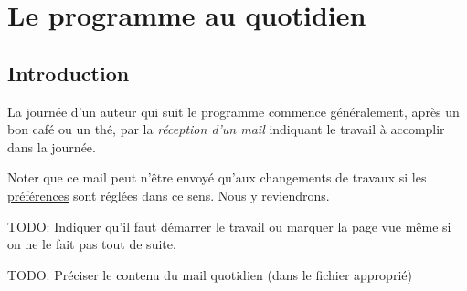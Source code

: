 % 
% 
% 
% 
% 
% 
% 
% 

\chapter{Le programme au quotidien}\hypertarget{programme-quotidien}{}\label{programme-quotidien}

\section{Introduction}\hypertarget{introduction}{}\label{introduction}

La journée d'un auteur qui suit le programme \unan{} commence généralement, après un bon café ou un thé, par la \emph{réception d'un mail} indiquant le travail à accomplir dans  la journée.

Noter que ce mail peut n'être envoyé qu'aux changements de travaux si les \hyperlink{preferences-auteur}{préférences} sont réglées dans ce sens. Nous y reviendrons.

TODO: Indiquer qu'il faut démarrer le travail ou marquer la page vue même si on ne le fait pas tout de suite.

TODO: Préciser le contenu du mail quotidien (dans le fichier approprié)

